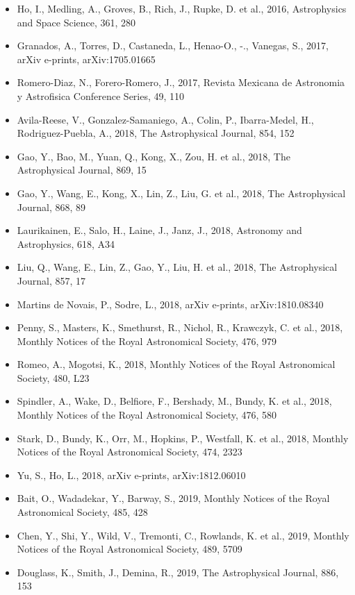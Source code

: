 \documentclass{letter}
\begin{document}
\begin{enumerate}
\begin{itemize}
\item Ho, I., Medling, A., Groves, B., Rich, J., Rupke, D. et al., 2016, Astrophysics and Space Science, 361, 280
\item Granados, A., Torres, D., Castaneda, L., Henao-O., -., Vanegas, S., 2017, arXiv e-prints, arXiv:1705.01665
\item Romero-Diaz, N., Forero-Romero, J., 2017, Revista Mexicana de Astronomia y Astrofisica Conference Series, 49, 110
\item Avila-Reese, V., Gonzalez-Samaniego, A., Colin, P., Ibarra-Medel, H., Rodriguez-Puebla, A., 2018, The Astrophysical Journal, 854, 152
\item Gao, Y., Bao, M., Yuan, Q., Kong, X., Zou, H. et al., 2018, The Astrophysical Journal, 869, 15
\item Gao, Y., Wang, E., Kong, X., Lin, Z., Liu, G. et al., 2018, The Astrophysical Journal, 868, 89
\item Laurikainen, E., Salo, H., Laine, J., Janz, J., 2018, Astronomy and Astrophysics, 618, A34
\item Liu, Q., Wang, E., Lin, Z., Gao, Y., Liu, H. et al., 2018, The Astrophysical Journal, 857, 17
\item Martins de Novais, P., Sodre, L., 2018, arXiv e-prints, arXiv:1810.08340
\item Penny, S., Masters, K., Smethurst, R., Nichol, R., Krawczyk, C. et al., 2018, Monthly Notices of the Royal Astronomical Society, 476, 979
\item Romeo, A., Mogotsi, K., 2018, Monthly Notices of the Royal Astronomical Society, 480, L23
\item Spindler, A., Wake, D., Belfiore, F., Bershady, M., Bundy, K. et al., 2018, Monthly Notices of the Royal Astronomical Society, 476, 580
\item Stark, D., Bundy, K., Orr, M., Hopkins, P., Westfall, K. et al., 2018, Monthly Notices of the Royal Astronomical Society, 474, 2323
\item Yu, S., Ho, L., 2018, arXiv e-prints, arXiv:1812.06010
\item Bait, O., Wadadekar, Y., Barway, S., 2019, Monthly Notices of the Royal Astronomical Society, 485, 428
\item Chen, Y., Shi, Y., Wild, V., Tremonti, C., Rowlands, K. et al., 2019, Monthly Notices of the Royal Astronomical Society, 489, 5709
\item Douglass, K., Smith, J., Demina, R., 2019, The Astrophysical Journal, 886, 153

\end{itemize}
\end{enumerate}
\end{document}
